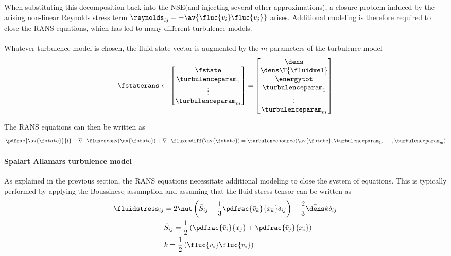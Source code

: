 \documentclass[../main.tex]{subfiles}
\begin{document}
When substituting this decomposition back into the \ac{NSE}(and injecting several other approximations), a closure problem induced by the arising non-linear Reynolds stress term ${\reynolds}_{ij}=-\av{\fluc{v_i}\fluc{v_j}}$ arises. Additional modeling is therefore required to close the \ac{RANS} equations, which has led to many different turbulence models.\\
\\
Whatever turbulence model is chosen, the fluid-state vector is augmented by the $m$ parameters of the turbulence model
\begin{align}
\fstaterans \leftarrow
\begin{bmatrix}
\fstate            \\
\turbulenceparam_1 \\
\vdots             \\
\turbulenceparam_m
\end{bmatrix} =
	\begin{bmatrix}
	\dens              \\
	\dens\T{\fluidvel} \\
	\energytot         \\
	\turbulenceparam_1 \\
	\vdots             \\
	\turbulenceparam_m
	\end{bmatrix}
\end{align}

The \ac{RANS} equations can then be written as
\begin{align}\label{eq:rans_eqautions}
\pdfrac{\av{\fstate}}{t} + \nabla\cdot\fluxesconv(\av{\fstate}) +  \nabla\cdot\fluxesdiff(\av{\fstate}) =
\turbulencesource(\av{\fstate},\turbulenceparam_1,\cdots,\turbulenceparam_m)
\end{align}

\paragraph{Spalart Allamars turbulence model}

As explained in the previous section, the \ac{RANS} equations necessitate additional modeling to close the system of equations. This is typically performed by applying the Boussinesq assumption and assuming that the fluid stress tensor can be written as
\begin{align}
\fluidstress_{ij}&=2 \nut \left( \bar{S}_{ij}-\frac{1}{3} \pdfrac{\bar{v}_k}{x_k} \delta_{ij} \right) - \frac{2}{3}\bar{\dens}k\delta_{ij} \label{eq:rans_turbulent_stress}\\
&\bar{S}_{ij}=\frac{1}{2}\left( \pdfrac{\bar{v}_i}{x_j}+\pdfrac{\bar{v}_j}{x_i} \right) \\
&k=\frac{1}{2} \left( \fluc{v_i}\fluc{v_i} \right)
\end{align}
\end{document}
